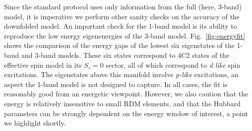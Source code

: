 Since the standard protocol uses only information from the full (here, 3-band) model, it is imperative we 
perform other sanity checks on the accuracy of the downfolded model. An important check for the 1-band model is its 
ability to reproduce the low energy eigenenergies of the 3-band model. 
Fig.~\ref{fig:energyfit} shows the comparison of the energy gaps of the 
lowest six eigenstates of the 1-band and 3-band models. These six states correspond 
to 4C2 states of the effective spin model in its $S_z=0$ sector, all of which correspond to \textit{d like} spin excitations. 
The eigenstates above this manifold involve \textit{p-like} excitations, an aspect the 1-band model is not designed to capture. 
In all cases, the fit is reasonably good from an energetic viewpoint. 
However, we also caution that the energy is relatively insensitive to small RDM elements, 
and that the Hubbard parameters can be strongly dependent on the energy window of interest, a point 
we highlight shortly. 
